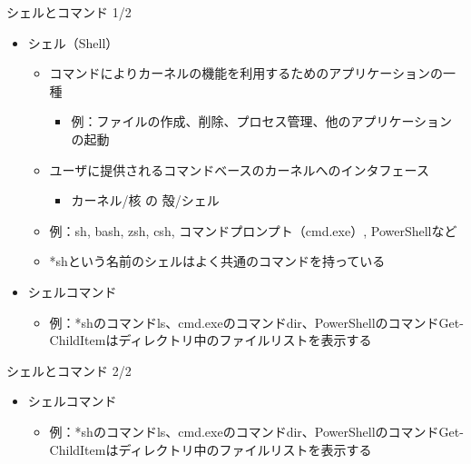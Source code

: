 \documentclass[12pt,aspectratio=169]{beamer}
\begin{document}
\begin{frame}{シェルとコマンド 1/2}
  \begin{itemize}
    \item シェル（Shell）
      \begin{itemize}
        \item コマンドによりカーネルの機能を利用するためのアプリケーションの一種
          \begin{itemize}
            \item 例：ファイルの作成、削除、プロセス管理、他のアプリケーションの起動
          \end{itemize}
        \item ユーザに提供されるコマンドベースのカーネルへのインタフェース
          \begin{itemize}
            \item カーネル/核 の 殻/シェル
          \end{itemize}
        \item 例：sh, bash, zsh, csh, コマンドプロンプト（cmd.exe）, PowerShellなど
        \item *shという名前のシェルはよく共通のコマンドを持っている
      \end{itemize}
    \item シェルコマンド
      \begin{itemize}
        \item 例：*shのコマンドls、cmd.exeのコマンドdir、PowerShellのコマンドGet-ChildItemはディレクトリ中のファイルリストを表示する
      \end{itemize}
  \end{itemize}

\end{frame}


\begin{frame}{シェルとコマンド 2/2}
  \begin{itemize}
    \item シェルコマンド
      \begin{itemize}
        \item 例：*shのコマンドls、cmd.exeのコマンドdir、PowerShellのコマンドGet-ChildItemはディレクトリ中のファイルリストを表示する
      \end{itemize}
  \end{itemize}


\end{frame}
\end{document}
